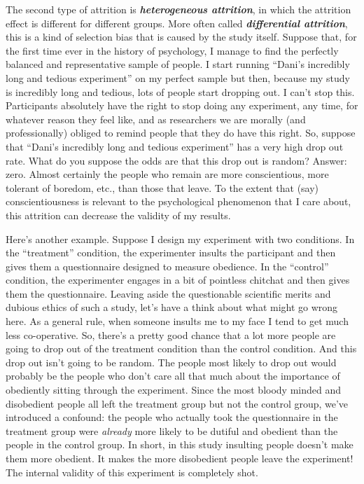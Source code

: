 \documentclass[
]{book}
\begin{document}
The second type of attrition is \textbf{\emph{heterogeneous attrition}}, in which the attrition effect is different for different groups. More often called \textbf{\emph{differential attrition}}, this is a kind of selection bias that is caused by the study itself. Suppose that, for the first time ever in the history of psychology, I manage to find the perfectly balanced and representative sample of people. I start running ``Dani's incredibly long and tedious experiment'' on my perfect sample but then, because my study is incredibly long and tedious, lots of people start dropping out. I can't stop this. Participants absolutely have the right to stop doing any experiment, any time, for whatever reason they feel like, and as researchers we are morally (and professionally) obliged to remind people that they do have this right. So, suppose that ``Dani's incredibly long and tedious experiment'' has a very high drop out rate. What do you suppose the odds are that this drop out is random? Answer: zero. Almost certainly the people who remain are more conscientious, more tolerant of boredom, etc., than those that leave. To the extent that (say) conscientiousness is relevant to the psychological phenomenon that I care about, this attrition can decrease the validity of my results.

Here's another example. Suppose I design my experiment with two conditions. In the ``treatment'' condition, the experimenter insults the participant and then gives them a questionnaire designed to measure obedience. In the ``control'' condition, the experimenter engages in a bit of pointless chitchat and then gives them the questionnaire. Leaving aside the questionable scientific merits and dubious ethics of such a study, let's have a think about what might go wrong here. As a general rule, when someone insults me to my face I tend to get much less co-operative. So, there's a pretty good chance that a lot more people are going to drop out of the treatment condition than the control condition. And this drop out isn't going to be random. The people most likely to drop out would probably be the people who don't care all that much about the importance of obediently sitting through the experiment. Since the most bloody minded and disobedient people all left the treatment group but not the control group, we've introduced a confound: the people who actually took the questionnaire in the treatment group were \emph{already} more likely to be dutiful and obedient than the people in the control group. In short, in this study insulting people doesn't make them more obedient. It makes the more disobedient people leave the experiment! The internal validity of this experiment is completely shot.
\end{document}

